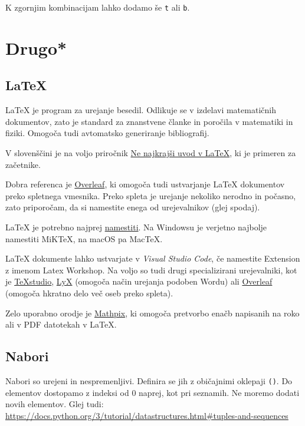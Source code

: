 \documentclass[
]{report}
\begin{document}
K zgornjim kombinacijam lahko dodamo še \texttt{t} ali \texttt{b}.

\hypertarget{drugo}{%
\chapter{Drugo*}\label{drugo}}

\hypertarget{latex}{%
\section{LaTeX}\label{latex}}

LaTeX je program za urejanje besedil. Odlikuje se v izdelavi matematičnih dokumentov, zato je standard za znanstvene članke in poročila v matematiki in fiziki. Omogoča tudi avtomatsko generiranje bibliografij.

V slovenščini je na voljo priročnik \href{https://users.fmf.uni-lj.si/plestenjak/Vaje/LaTeX/lshort.pdf}{Ne najkrajši uvod v LaTeX}, ki je primeren za začetnike.

Dobra referenca je \href{https://www.overleaf.com/learn}{Overleaf}, ki omogoča tudi ustvarjanje LaTeX dokumentov preko spletnega vmesnika. Preko spleta je urejanje nekoliko nerodno in počasno, zato priporočam, da si namestite enega od urejevalnikov (glej spodaj).

LaTeX je potrebno najprej \href{https://www.latex-project.org/get/}{namestiti}. Na Windowsu je verjetno najbolje namestiti MiKTeX, na macOS pa MacTeX.

LaTeX dokumente lahko ustvarjate v \emph{Visual Studio Code}, če namestite Extension z imenom Latex Workshop. Na voljo so tudi drugi specializirani urejevalniki, kot je \href{https://www.texstudio.org}{TeXstudio}, \href{https://www.lyx.org}{LyX} (omogoča način urejanja podoben Wordu) ali \href{https://www.overleaf.com}{Overleaf} (omogoča hkratno delo več oseb preko spleta).

Zelo uporabno orodje je \href{https://mathpix.com}{Mathpix}, ki omogoča pretvorbo enačb napisanih na roko ali v PDF datotekah v LaTeX.

\hypertarget{nabori}{%
\section{Nabori}\label{nabori}}

Nabori so urejeni in nespremenljivi. Definira se jih z običajnimi oklepaji \texttt{()}. Do elementov dostopamo z indeksi od 0 naprej, kot pri seznamih. Ne moremo dodati novih elementov. Glej tudi: \url{https://docs.python.org/3/tutorial/datastructures.html\#tuples-and-sequences}
\end{document}

